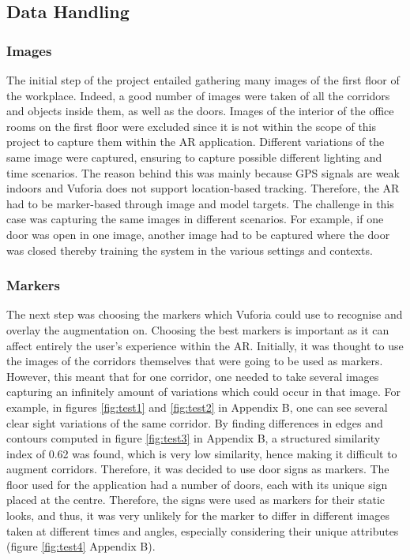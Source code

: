 \documentclass{aifyp}
\begin{document}
\subsection{Data Handling}
\subsubsection{Images}
The initial step of the project entailed gathering many images of the first floor of the workplace. Indeed, a good number of images were taken of all the corridors and objects inside them, as well as the doors. Images of the interior of the office rooms on the first floor were excluded since it is not within the scope of this project to capture them within the AR application. Different variations of the same image were captured, ensuring to capture possible different lighting and time scenarios. The reason behind this was mainly because GPS signals are weak indoors and Vuforia does not support location-based tracking. Therefore, the AR had to be marker-based through image and model targets. The challenge in this case was capturing the same images in different scenarios. For example, if one door was open in one image, another image had to be captured where the door was closed thereby training the system in the various settings and contexts.
\subsubsection{Markers}
The next step was choosing the markers which Vuforia could use to recognise and overlay the augmentation on. Choosing the best markers is important as it can affect entirely the user’s experience within the AR. Initially, it was thought to use the images of the corridors themselves that were going to be used as markers. However, this meant that for one corridor, one needed to take several images capturing an infinitely amount of variations which could occur in that image. For example, in figures \ref{fig:test1} and \ref{fig:test2} in Appendix B, one can see several clear sight variations of the same corridor. By finding differences in edges and contours computed in figure \ref{fig:test3} in Appendix B, a structured similarity index of 0.62 was found, which is very low similarity, hence making it difficult to augment corridors. Therefore, it was decided to use door signs as markers. The floor used for the application had a number of doors, each with its unique sign placed at the centre. Therefore, the signs were used as markers for their static looks, and thus, it was very unlikely for the marker to differ in different images taken at different times and angles, especially considering their unique attributes (figure \ref{fig:test4} Appendix B).
\end{document}
